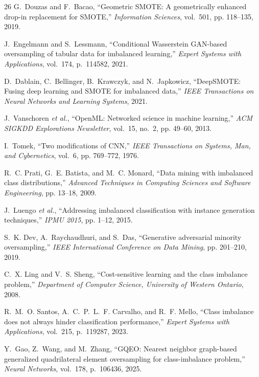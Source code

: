 \documentclass{ijSmartGrid}
\theoremstyle{definition}
\begin{document}
\begin{thebibliography}{26}
G.~Douzas and F.~Bacao,
``Geometric SMOTE: A geometrically enhanced drop-in replacement for SMOTE,''
\emph{Information Sciences}, vol.~501, pp. 118--135, 2019.

J.~Engelmann and S.~Lessmann,
``Conditional Wasserstein GAN-based oversampling of tabular data for imbalanced learning,''
\emph{Expert Systems with Applications}, vol.~174, p.~114582, 2021.

D.~Dablain, C.~Bellinger, B.~Krawczyk, and N.~Japkowicz,
``DeepSMOTE: Fusing deep learning and SMOTE for imbalanced data,''
\emph{IEEE Transactions on Neural Networks and Learning Systems}, 2021.

J.~Vanschoren \emph{et al.},
``OpenML: Networked science in machine learning,''
\emph{ACM SIGKDD Explorations Newsletter}, vol.~15, no.~2, pp. 49--60, 2013.

I.~Tomek,
``Two modifications of CNN,''
\emph{IEEE Transactions on Systems, Man, and Cybernetics}, vol.~6, pp. 769--772, 1976.

R.~C. Prati, G.~E. Batista, and M.~C. Monard,
``Data mining with imbalanced class distributions,''
\emph{Advanced Techniques in Computing Sciences and Software Engineering}, pp. 13--18, 2009.

J.~Luengo \emph{et al.},
``Addressing imbalanced classification with instance generation techniques,''
\emph{IPMU 2015}, pp. 1--12, 2015.

S.~K. Dev, A.~Raychaudhuri, and S.~Das,
``Generative adversarial minority oversampling,''
\emph{IEEE International Conference on Data Mining}, pp. 201--210, 2019.

C.~X. Ling and V.~S. Sheng,
``Cost-sensitive learning and the class imbalance problem,''
\emph{Department of Computer Science, University of Western Ontario}, 2008.

R.~M.~O. Santos, A.~C.~P.~L.~F. Carvalho, and R.~F. Mello,
``Class imbalance does not always hinder classification performance,''
\emph{Expert Systems with Applications}, vol.~215, p.~119287, 2023.

Y.~Gao, Z.~Wang, and M.~Zhang,
``GQEO: Nearest neighbor graph-based generalized quadrilateral element oversampling for class-imbalance problem,''
\emph{Neural Networks}, vol.~178, p.~106436, 2025.


\end{thebibliography}
\end{document}
